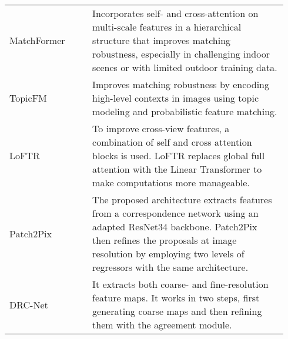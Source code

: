 \begin{table*}[h]
\begin{tabular}{ p{0.28\linewidth}|p{0.66\linewidth}}
    MatchFormer \citep{wang2022matchformer} & Incorporates self- and cross-attention on multi-scale features in a hierarchical structure that improves matching robustness, especially in challenging indoor scenes or with limited outdoor training data. \\
     
    TopicFM \citep{giang2022topicfm} & Improves matching robustness by encoding high-level contexts in images using topic modeling and probabilistic feature matching. \\
    
    LoFTR \citep{sun2021loftr} & To improve cross-view features, a combination of self and cross attention blocks is used. LoFTR replaces global full attention with the Linear Transformer \citep{tang2022quadtree} to make computations more manageable. \\
    
    Patch2Pix \citep{zhou2021patch2pix} & The proposed architecture extracts features from a correspondence network using an adapted ResNet34 backbone. Patch2Pix then refines the proposals at image resolution by employing two levels of regressors with the same architecture. \\
    
    DRC-Net \citep{li2020dual} & It extracts both coarse- and fine-resolution feature maps. It works in two steps, first generating coarse maps and then refining them with the agreement module. \\
    
    \hline
    \end{tabular}
\end{table*}
